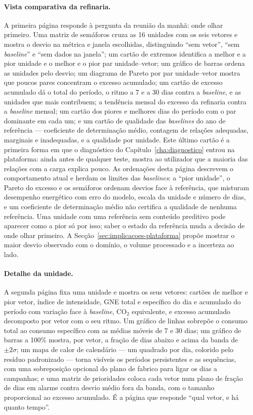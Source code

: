 \paragraph{Vista comparativa da refinaria.} A primeira página responde à
pergunta da reunião da manhã: onde olhar primeiro. Uma matriz de
semáforos cruza as 16 unidades com os seis vetores e mostra o desvio na
métrica e janela escolhidas, distinguindo ``sem vetor'', ``sem
\emph{baseline}'' e ``sem dados na janela''; um cartão de extremos
identifica a melhor e a pior unidade e o melhor e o pior par
unidade--vetor; um gráfico de barras ordena as unidades pelo desvio; um
diagrama de Pareto por par unidade--vetor mostra que poucos pares
concentram o excesso acumulado; um cartão de excesso acumulado dá o total
do período, o ritmo a 7 e a 30 dias contra a \emph{baseline}, e as unidades
que mais contribuem; a tendência mensal do excesso da refinaria contra a
\emph{baseline} mensal; um cartão dos piores e melhores dias do período
com o par dominante em cada um; e um cartão de qualidade das
\emph{baselines} do ano de referência --- coeficiente de determinação
médio, contagem de relações adequadas, marginais e inadequadas, e a
qualidade por unidade. Este último cartão é a primeira forma em que o
diagnóstico do Capítulo~\ref{cha:diagnostico} entrou na plataforma: ainda
antes de qualquer teste, mostra ao utilizador que a maioria das relações
com a carga explica pouco. As ordenações desta página descrevem o
comportamento atual e herdam os limites das \emph{baselines}: a ``pior
unidade'', o Pareto do excesso e os semáforos ordenam desvios face à
referência, que misturam desempenho energético com erro do modelo, escala
da unidade e número de dias, e um coeficiente de determinação médio não
certifica a qualidade de nenhuma referência. Uma unidade com uma referência
sem conteúdo preditivo pode aparecer como a pior só por isso; saber o
estado da referência muda a decisão de onde olhar primeiro. A
Secção~\ref{sec:implicacoes-plataforma} propõe mostrar o maior desvio
observado com o domínio, o volume processado e a incerteza ao lado.

\paragraph{Detalhe da unidade.} A segunda página fixa uma unidade e mostra
os seus vetores: cartões de melhor e pior vetor, índice de intensidade,
GNE total e específico do dia e acumulado do período com variação face à
\emph{baseline}, CO$_2$ equivalente, e excesso acumulado decomposto por
vetor com o seu ritmo. Um gráfico de linhas sobrepõe o consumo total ao
consumo específico com as médias móveis de 7 e 30 dias; um gráfico de
barras a 100\% mostra, por vetor, a fração de dias abaixo e acima da
banda de $\pm2\sigma$; um mapa de calor de calendário --- um quadrado por
dia, colorido pelo resíduo padronizado --- torna visíveis os períodos
persistentes e as sequências, com uma sobreposição opcional do plano de
fabrico para ligar os dias a campanhas; e uma matriz de prioridades coloca
cada vetor num plano de fração de dias em alarme contra desvio médio
fora da banda, com o tamanho proporcional ao excesso acumulado. É a
página que responde ``qual vetor, e há quanto tempo''.

